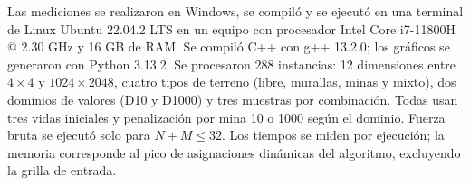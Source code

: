 Las mediciones se realizaron en Windows, se compiló y se ejecutó en una terminal de Linux Ubuntu 22.04.2 LTS 
en un equipo con procesador Intel Core i7-11800H 
@ 2.30 GHz y 16 GB de RAM. Se compiló C++ con g++ 13.2.0; los gráficos se generaron con Python 3.13.2. 
Se procesaron 288 instancias: 12 dimensiones entre $4\times4$ y $1024\times2048$, 
cuatro tipos de terreno (libre, murallas, minas y mixto), 
dos dominios de valores (D10 y D1000) y tres muestras por combinación.
Todas usan tres vidas iniciales y penalización por mina 10 o 1000 según el dominio.
Fuerza bruta se ejecutó solo para $N+M\leq32$. 
Los tiempos se miden por ejecución; la memoria corresponde al pico de asignaciones dinámicas
del algoritmo, excluyendo la grilla de entrada.